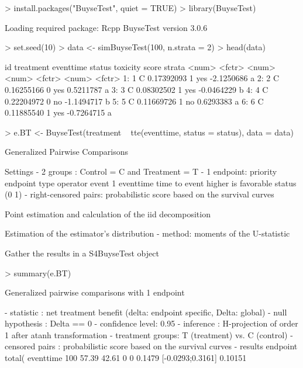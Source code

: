 \documentclass[12pt]{article}
\theoremstyle{definition}
\begin{document}
\begin{Rcode}
> install.packages("BuyseTest", quiet = TRUE)
> library(BuyseTest)
\end{Rcode}
\begin{Routput}
Loading required package: Rcpp
BuyseTest version 3.0.6
\end{Routput}

\begin{Rcode}
> set.seed(10)
> data <- simBuyseTest(100, n.strata = 2)
> head(data)
\end{Rcode}
\begin{Routput}
      id treatment  eventtime status toxicity      score strata
   <num>    <fctr>      <num>  <num>   <fctr>      <num> <fctr>
1:     1         C 0.17392093      1      yes -2.1250686      a
2:     2         C 0.16255166      0      yes  0.5211787      a
3:     3         C 0.08302502      1      yes -0.0464229      b
4:     4         C 0.22204972      0       no -1.1494717      b
5:     5         C 0.11669726      1       no  0.6293383      a
6:     6         C 0.11885540      1      yes -0.7264715      a
\end{Routput}


\begin{Rcode}
> e.BT <- BuyseTest(treatment ~ tte(eventtime, status = status), 
                    data = data)
\end{Rcode}
\begin{Routput}
         Generalized Pairwise Comparisons

Settings 
- 2 groups  : Control = C and Treatment = T
- 1 endpoint: 
priority endpoint   type           operator             event       
1        eventtime  time to event  higher is favorable  status (0 1)
- right-censored pairs: probabilistic score based on the survival curves 

Point estimation and calculation of the iid decomposition

Estimation of the estimator's distribution 
- method: moments of the U-statistic

Gather the results in a S4BuyseTest object 
\end{Routput}

\clearpage

\begin{Rcode}
> summary(e.BT)
\end{Rcode}
\begin{Routput}
	Generalized pairwise comparisons with 1 endpoint

- statistic       : net treatment benefit  (delta: endpoint specific, Delta: global) 
- null hypothesis : Delta == 0 
- confidence level: 0.95 
- inference       : H-projection of order 1 after atanh transformation 
- treatment groups: T (treatment) vs. C (control) 
- censored pairs  : probabilistic score based on the survival curves
- results
endpoint total(%
eventtime     100        57.39          42.61          0        0 0.1479  [-0.0293;0.3161] 0.10151 

\end{Routput}
\end{document}
